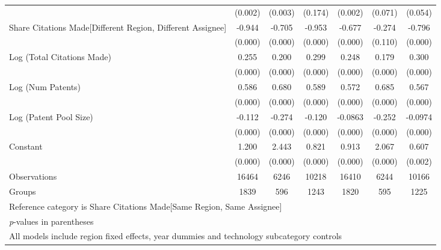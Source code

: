 \begin{table}[htbp]
\begin{adjustbox}{angle=90}
\begin{tabular}{l*{6}{c}}
                &  (0.002)&  (0.003)&  (0.174)&  (0.002)&  (0.071)&  (0.054)\\
Share Citations Made[Different Region, Different Assignee]&   -0.944&   -0.705&   -0.953&   -0.677&   -0.274&   -0.796\\
                &  (0.000)&  (0.000)&  (0.000)&  (0.000)&  (0.110)&  (0.000)\\
Log (Total Citations Made)&    0.255&    0.200&    0.299&    0.248&    0.179&    0.300\\
                &  (0.000)&  (0.000)&  (0.000)&  (0.000)&  (0.000)&  (0.000)\\
Log (Num Patents)&    0.586&    0.680&    0.589&    0.572&    0.685&    0.567\\
                &  (0.000)&  (0.000)&  (0.000)&  (0.000)&  (0.000)&  (0.000)\\
Log (Patent Pool Size)&   -0.112&   -0.274&   -0.120&  -0.0863&   -0.252&  -0.0974\\
                &  (0.000)&  (0.000)&  (0.000)&  (0.000)&  (0.000)&  (0.000)\\
Constant        &    1.200&    2.443&    0.821&    0.913&    2.067&    0.607\\
                &  (0.000)&  (0.000)&  (0.000)&  (0.000)&  (0.000)&  (0.002)\\
\hline
Observations    &    16464&     6246&    10218&    16410&     6244&    10166\\
Groups          &     1839&      596&     1243&     1820&      595&     1225\\
\hline\hline
\multicolumn{7}{l}{\footnotesize Reference category is Share Citations Made[Same Region, Same Assignee]}\\
\multicolumn{7}{l}{\footnotesize \textit{p}-values in parentheses}\\
\multicolumn{7}{l}{\footnotesize All models include region fixed effects, year dummies and technology subcategory controls}\\
\end{tabular}
\end{adjustbox}
\end{table}
